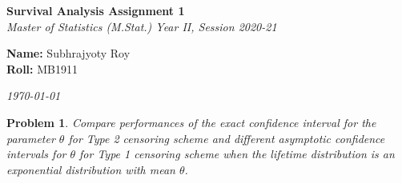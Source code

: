\documentclass[12pt]{article}
\theoremstyle{problemstyle}
\newtheorem{pbm}{Problem}
\newenvironment{problem}{
\begin{tcolorbox}[colback=green!10!white,colframe=black!75!black, parbox = false]\begin{pbm} }{\end{pbm}\end{tcolorbox} }
\begin{document}
\begin{titlepage}
    \begin{center}
        \vspace*{3cm}
        \Huge{\textbf{Survival Analysis Assignment 1}}\\
        \vspace*{1cm}
        \large{\textit{Master of Statistics (M.Stat.) Year II, Session 2020-21}}\\
        \vspace*{5cm}
        \begin{tcolorbox}[colback=black!5!white,colframe=black!75!black, width = 0.5\linewidth]
            \vspace*{0.5cm}
            \textbf{Name: } Subhrajyoty Roy\\
            \textbf{Roll: } MB1911
            \vspace*{0.5cm}
        \end{tcolorbox}
    \end{center}
    \vspace*{3cm}
    \begin{flushright}
        \large\textit{\today}
    \end{flushright}
\end{titlepage}

\begin{problem}
    Compare performances of the exact confidence interval for the parameter $\theta$ for Type 2 censoring scheme and different asymptotic confidence intervals for $\theta$ for Type 1 censoring scheme when the lifetime distribution is an exponential distribution with mean $\theta$. 
\end{problem}
\end{document}

